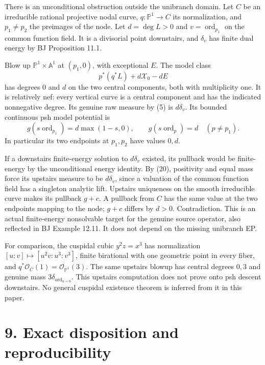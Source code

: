 \documentclass[
  11pt,
]{article}
\begin{document}
There is an unconditional obstruction outside the unibranch domain. Let
\(C\) be an irreducible rational projective nodal curve,
\(q:\mathbb P^1\to C\) its normalization, and \(p_1\ne p_2\) the
preimages of the node. Let \(d=\deg L>0\) and
\(v=\operatorname{ord}_{p_1}\) on the common function field. It is a
divisorial point downstairs, and \(\delta_v\) has finite dual energy by
BJ Proposition 11.1.

Blow up \(\mathbb P^1\times\mathbb A^1\) at \((p_1,0)\), with
exceptional \(E\). The model class \[p^*(q^*L)+d\mathcal X_0-dE\] has
degrees \(0\) and \(d\) on the two central components, both with
multiplicity one. It is relatively nef: every vertical curve is a
central component and has the indicated nonnegative degree. Its genuine
raw measure by (5) is \(d\delta_v\). Its bounded continuous psh model
potential is \[g(s\operatorname{ord}_{p_1})=d\max(1-s,0),\qquad
g(s\operatorname{ord}_p)=d\quad(p\ne p_1).\] In particular its two
endpoints at \(p_1,p_2\) have values \(0,d\).

If a downstairs finite-energy solution to \(d\delta_v\) existed, its
pullback would be finite-energy by the unconditional energy identity. By
(20), positivity and equal mass force its upstairs measure to be
\(d\delta_v\), since a valuation of the common function field has a
singleton analytic lift. Upstairs uniqueness on the smooth irreducible
curve makes its pullback \(g+c\). A pullback from \(C\) has the same
value at the two endpoints mapping to the node; \(g+c\) differs by
\(d>0\). Contradiction. This is an actual finite-energy nonsolvable
target for the genuine source operator, also reflected in BJ Example
12.11. It does not depend on the missing unibranch EP.

For comparison, the cuspidal cubic \(y^2z=x^3\) has normalization
\([u:v]\mapsto[u^2v:u^3:v^3]\), finite birational with one geometric
point in every fiber, and
\(q^*\mathcal O_C(1)=\mathcal O_{\mathbb P^1}(3)\). The same upstairs
blowup has central degrees \(0,3\) and genuine mass
\(3\delta_{\operatorname{ord}_{u=0}}\). This upstairs computation does
not prove onto psh descent downstairs. No general cuspidal existence
theorem is inferred from it in this paper.

\section{9. Exact disposition and
reproducibility}\label{exact-disposition-and-reproducibility}
\end{document}
